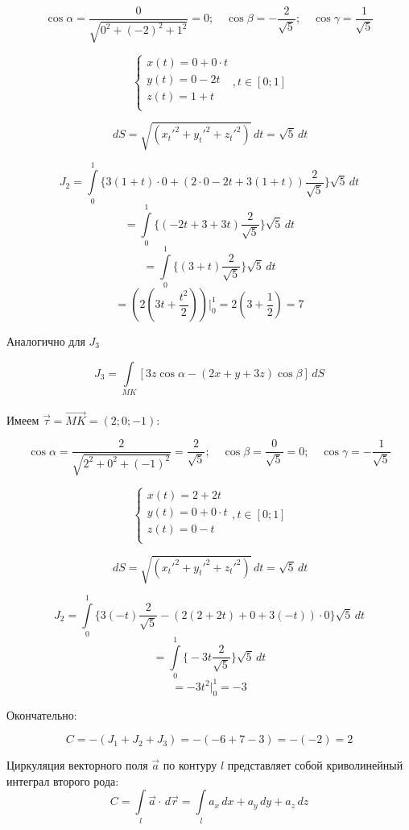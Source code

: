 \documentclass[12pt]{article}
\begin{document}
\begin{enumerate}[wide, labelwidth=!, labelindent=0pt]
		$$\cos\alpha = \frac{0}{\sqrt{0^2 + (-2)^2+1^2}} = 0;\quad \cos\beta = -\frac{2}{\sqrt{5}};\quad \cos\gamma = \frac{1}{\sqrt{5}}$$
		
		$$\begin{cases}
			x(t) = 0 + 0\cdot t\\
			y(t) = 0 -2t\\
			z(t) = 1 + t\\
		\end{cases}, t \in [0;1]$$
		
		$$\,dS = \sqrt{(x_t'^2 + y_t'^2 + z_t'^2 )} \,dt = \sqrt{5} \,dt$$  

		$$J_2 = \int \limits_{0}^1 \bigg\{ 3(1 + t)\cdot 0 + (2 \cdot 0 -2t  + 3(1 + t))\frac{2}{\sqrt{5}}  \bigg\}\sqrt{5} \,dt$$
		$$= \int \limits_{0}^1 \bigg\{ ( -2t  + 3 + 3t)\frac{2}{\sqrt{5}}  \bigg\}\sqrt{5} \,dt$$
		$$= \int \limits_{0}^1 \bigg\{  ( 3 + t)\frac{2}{\sqrt{5}}  \bigg\}\sqrt{5} \,dt$$
		$$= (2 (3 t + \frac{t^2}{2}))\Big|_0^{1} = 2 (3  + \frac{1}{2}) = 7$$

		Аналогично для $ J_3 $ 

		$$J_3 = \int \limits_{MK} [3z\cos\alpha -(2x + y + 3z)\cos\beta]\,dS$$\\
		Имеем $ \vec{\tau} = \vec{MK} = (2;0;-1) $:

		$$\cos\alpha = \frac{2}{\sqrt{2^2+0^2+(-1)^2}} = \frac{2}{\sqrt{5}};\quad \cos\beta = \frac{0}{\sqrt{5}}=0;\quad \cos\gamma = -\frac{1}{\sqrt{5}}$$
		
		$$\begin{cases}
			x(t) = 2 + 2t\\
			y(t) = 0 + 0\cdot t\\
			z(t) = 0 -t\\
		\end{cases}, t \in [0;1]$$
		
		$$\,dS = \sqrt{(x_t'^2 + y_t'^2 + z_t'^2 )} \,dt = \sqrt{5} \,dt$$  

		$$J_2 = \int \limits_{0}^1 \bigg\{ 3(-t)\frac{2}{\sqrt{5}} - (2(2 + 2t) + 0 + 3(-t))\cdot0 \bigg\}\sqrt{5} \,dt$$
		$$= \int \limits_{0}^1 \bigg\{ -3t\frac{2}{\sqrt{5}}  \bigg\}\sqrt{5} \,dt$$
		$$= -3t^2\Big|_0^{1} = -3$$

		Окончательно:

		$$ C = -(J_1 + J_2+J_3)  = -(-6 + 7 -3) = -(-2) = 2$$
		
		Циркуляция векторного поля $ \vec{a} $ по контуру $ l $ представляет собой криволинейный интеграл второго рода:
		$$ C = \int \limits_{l} \vec{a} \cdot \,d\vec{r} = \int \limits_{l} a_x \,d x + a_y \,d y + a_z \,d z$$
		

\end{enumerate}
\end{document}
